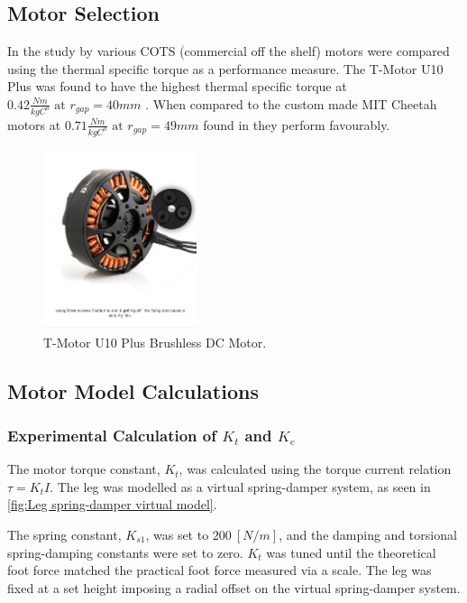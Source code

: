 \subsection{Motor Selection}

In the study by \cite{Kalouche2016} various COTS (commercial off the shelf) motors were compared using the thermal specific torque as a performance measure. The T-Motor U10 Plus was found to have the highest thermal specific torque at $0.42 \frac{Nm}{kgC^o } \text{ at } r_{gap} = 40 mm$ \cite{Kalouche2016}. When compared to the custom made MIT Cheetah motors at $0.71 \frac{Nm}{kgC^o } \text{ at } r_{gap} = 49 mm$ found in \cite{Wang2012} they perform favourably. 

\begin{figure}
\centering
\includegraphics[clip, trim=0cm 5cm 0cm 2cm, width=0.4\textwidth]{images/motor/TMotorU10Plus} 
\caption{T-Motor U10 Plus Brushless DC Motor.}
\label{fig:TMotorU10Plus}
\end{figure}

\subsection{Motor Model Calculations}

\subsubsection{Experimental Calculation of $K_t$ and $K_e$}
The motor torque constant, $K_t$, was calculated using the torque current relation $\tau = K_tI$. The leg was modelled as a virtual spring-damper system, as seen in \cref{fig:Leg spring-damper virtual model}. 

The spring constant, $K_{s1}$, was set to $200\ [N/m]$, and the damping and torsional spring-damping constants were set to zero. $K_t$ was tuned until the theoretical foot force matched the practical foot force measured via a scale. The leg was fixed at a set height imposing a radial offset on the virtual spring-damper system.

